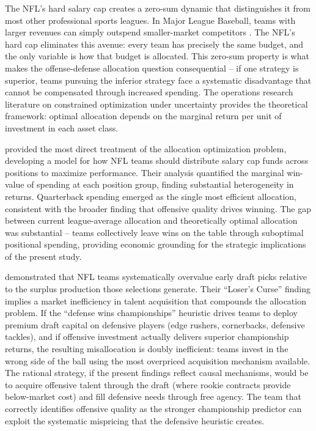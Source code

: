 \documentclass[12pt,a4paper]{article}
\begin{document}
The NFL's hard salary cap creates a zero-sum dynamic that distinguishes it from most other professional sports leagues. In Major League Baseball, teams with larger revenues can simply outspend smaller-market competitors \citep{lewis2003moneyball}. The NFL's hard cap eliminates this avenue: every team has precisely the same budget, and the only variable is how that budget is allocated. This zero-sum property is what makes the offense-defense allocation question consequential -- if one strategy is superior, teams pursuing the inferior strategy face a systematic disadvantage that cannot be compensated through increased spending. The operations research literature on constrained optimization under uncertainty provides the theoretical framework: optimal allocation depends on the marginal return per unit of investment in each asset class.

\citet{mulholland2019optimizing} provided the most direct treatment of the allocation optimization problem, developing a model for how NFL teams should distribute salary cap funds across positions to maximize performance. Their analysis quantified the marginal win-value of spending at each position group, finding substantial heterogeneity in returns. Quarterback spending emerged as the single most efficient allocation, consistent with the broader finding that offensive quality drives winning. The gap between current league-average allocation and theoretically optimal allocation was substantial -- teams collectively leave wins on the table through suboptimal positional spending, providing economic grounding for the strategic implications of the present study.

\citet{massey2013loserscurse} demonstrated that NFL teams systematically overvalue early draft picks relative to the surplus production those selections generate. Their ``Loser's Curse'' finding implies a market inefficiency in talent acquisition that compounds the allocation problem. If the ``defense wins championships'' heuristic drives teams to deploy premium draft capital on defensive players (edge rushers, cornerbacks, defensive tackles), and if offensive investment actually delivers superior championship returns, the resulting misallocation is doubly inefficient: teams invest in the wrong side of the ball using the most overpriced acquisition mechanism available. The rational strategy, if the present findings reflect causal mechanisms, would be to acquire offensive talent through the draft (where rookie contracts provide below-market cost) and fill defensive needs through free agency. The team that correctly identifies offensive quality as the stronger championship predictor can exploit the systematic mispricing that the defensive heuristic creates.
\end{document}

